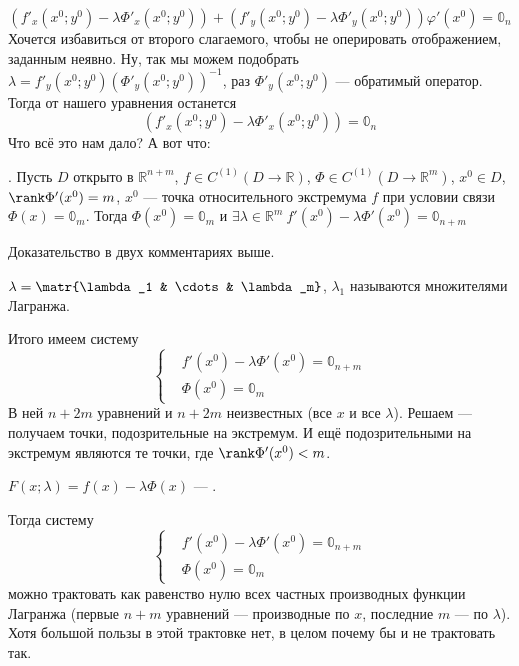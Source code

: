 \documentclass{article}
\begin{document}
\begin{itemize}
\begin{Comment}
$$            (f'_x(x^0;y^0)-\lambda\Phi'_x(x^0;y^0))+(f'_y(x^0;y^0)-\lambda\Phi'_y(x^0;y^0))\varphi'(x^0)=\mathbb0_n
            $$
            Хочется избавиться от второго слагаемого, чтобы не оперировать отображением, заданным неявно. Ну, так мы можем подобрать $\lambda=f'_y(x^0;y^0)(\Phi'_y(x^0;y^0))^{-1}$, раз $\Phi'_y(x^0;y^0)$ --- обратимый оператор. Тогда от нашего уравнения останется
            $$
            (f'_x(x^0;y^0)-\lambda\Phi'_x(x^0;y^0))=\mathbb0_n
            $$
            Что всё это нам дало? А вот что:
        \end{Comment}
        \thm {}. Пусть $D$ открыто в $\mathbb R^{n+m}$, $f\in C^{(1)}(D\to\mathbb R)$, $\Phi\in C^{(1)}(D\to\mathbb R^m)$, $x^0\in D$, $\rank\Phi'(x^0)=m$, $x^0$ --- точка относительного экстремума $f$ при условии связи $\Phi(x)=\mathbb0_m$. Тогда $\Phi(x^0)=\mathbb0_m$ и $\exists\lambda\in\mathbb R^m~f'(x^0)-\lambda\Phi'(x^0)=\mathbb0_{n+m}$
        \begin{Proof}
            Доказательство в двух комментариях выше.
        \end{Proof}
        \dfn $\lambda=\matr{\lambda_1 & \cdots & \lambda_m}$, $\lambda_1$ называются множителями Лагранжа.
        \begin{Comment}
            Итого имеем систему
            $$
            \left\{\begin{aligned}
                &f'(x^0)-\lambda\Phi'(x^0)=\mathbb0_{n+m}\\
                &\Phi(x^0)=\mathbb0_m
            \end{aligned}\right.
            $$
            В ней $n+2m$ уравнений и $n+2m$ неизвестных (все $x$ и все $\lambda$). Решаем --- получаем точки, подозрительные на экстремум. И ещё подозрительными на экстремум являются те точки, где $\rank\Phi'(x^0)<m$.
        \end{Comment}
        \dfn $F(x;\lambda)=f(x)-\lambda\Phi(x)$ --- .
        \begin{Comment}
            Тогда систему $$
            \left\{\begin{aligned}
                &f'(x^0)-\lambda\Phi'(x^0)=\mathbb0_{n+m}\\
                &\Phi(x^0)=\mathbb0_m
            \end{aligned}\right.
            $$
            можно трактовать как равенство нулю всех частных производных функции Лагранжа (первые $n+m$ уравнений --- производные по $x$, последние $m$ --- по $\lambda$). Хотя большой пользы в этой трактовке нет, в целом почему бы и не трактовать так.

\end{Comment}
\end{itemize}
\end{document}
